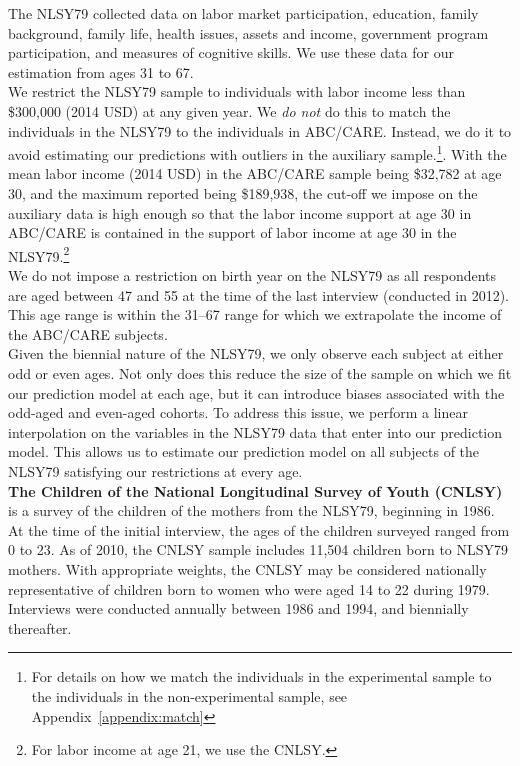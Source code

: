 \noindent The NLSY79 collected data on labor market participation, education, family background, family life, health issues, assets and income, government program participation, and measures of cognitive skills. We use these data for our estimation from ages 31 to 67.\\

\noindent We restrict the NLSY79 sample to individuals with labor income less than \$300,000 (2014 USD) at any given year. We \textit{do not} do this to match the individuals in the NLSY79 to the individuals in ABC/CARE. Instead, we do it to avoid estimating our predictions with outliers in the auxiliary sample.\footnote{For details on how we match the individuals in the experimental sample to the individuals in the non-experimental sample, see Appendix~\ref{appendix:match}}. With the mean labor income (2014 USD) in the ABC/CARE sample being \$32,782 at age 30, and the maximum reported being \$189,938, the cut-off we impose on the auxiliary data is high enough so that the labor income support at age 30 in ABC/CARE is contained in the support of labor income at age 30 in the NLSY79.\footnote{For labor income at age 21, we use the CNLSY.}\\

\noindent We do not impose a restriction on birth year on the NLSY79 as all respondents are aged between 47 and 55 at the time of the last interview (conducted in 2012). This age range is within the 31--67 range for which we extrapolate the income of the ABC/CARE subjects. \\

\noindent Given the biennial nature of the NLSY79, we only observe each subject at either odd or even ages. Not only does this reduce the size of the sample on which we fit our prediction model at each age, but it can introduce biases associated with the odd-aged and even-aged cohorts. To address this issue, we perform a linear interpolation on the variables in the NLSY79 data that enter into our prediction model. This allows us to estimate our prediction model on all subjects of the NLSY79 satisfying our restrictions at every age. \\

\noindent \textbf{The Children of the National Longitudinal Survey of Youth (CNLSY)} is a survey of the children of the mothers from the NLSY79, beginning in 1986. At the time of the initial interview, the ages of the children surveyed ranged from 0 to 23. As of 2010, the CNLSY sample includes 11,504 children born to NLSY79 mothers. With appropriate weights, the CNLSY may be considered nationally representative of children born to women who were aged 14 to 22 during 1979. Interviews were conducted annually between 1986 and 1994, and biennially thereafter. \\


